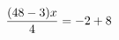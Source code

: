 \documentclass[preview]{standalone}
\begin{document}
\begin{align*}
\special{dvisvgm:raw <g id='unique000'>}\frac{(48 - 3) x}{4} = -2 + 8\special{dvisvgm:raw </g>}
\end{align*}
\end{document}
